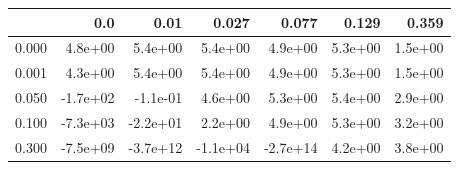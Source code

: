 \begin{tabular}{lrrrrrr}
\toprule
{} &      0.0 &     0.01 &    0.027 &    0.077 &   0.129 &   0.359 \\
\midrule
0.000 &  4.8e+00 &  5.4e+00 &  5.4e+00 &  4.9e+00 & 5.3e+00 & 1.5e+00 \\
0.001 &  4.3e+00 &  5.4e+00 &  5.4e+00 &  4.9e+00 & 5.3e+00 & 1.5e+00 \\
0.050 & -1.7e+02 & -1.1e-01 &  4.6e+00 &  5.3e+00 & 5.4e+00 & 2.9e+00 \\
0.100 & -7.3e+03 & -2.2e+01 &  2.2e+00 &  4.9e+00 & 5.3e+00 & 3.2e+00 \\
0.300 & -7.5e+09 & -3.7e+12 & -1.1e+04 & -2.7e+14 & 4.2e+00 & 3.8e+00 \\
\bottomrule
\end{tabular}
